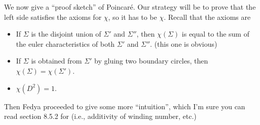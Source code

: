 We now give a ``proof sketch'' of Poincar\'e. Our strategy will be to prove that the left side satisfies the axioms for $\chi$, so it has to be $\chi$. Recall that the axioms are
\begin{itemize}
    \item If $\Sigma$ is the disjoint union of $\Sigma'$ and $\Sigma''$, then $\chi(\Sigma)$ is equal to the sum of the euler characteristics of both $\Sigma'$ and $\Sigma''$. (this one is obvious)
    \item If $\Sigma$ is obtained from $\Sigma'$ by gluing two boundary circles, then $\chi(\Sigma) = \chi(\Sigma')$.
    \item $\chi(D^2) = 1$.
\end{itemize}
Then Fedya proceeded to give some more ``intuition'', which I'm sure you can read section 8.5.2 for (i.e., additivity of winding number, etc.)